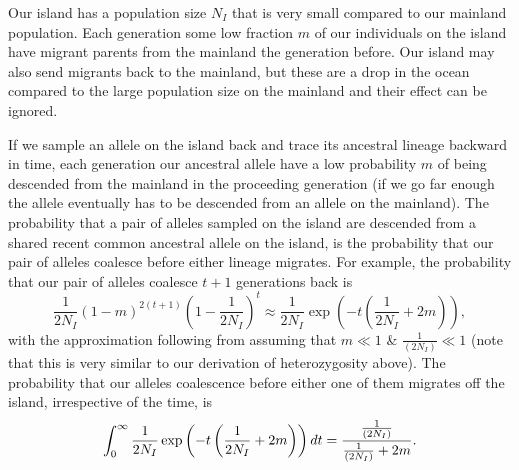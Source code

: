 Our island has a population size
$N_{I}$ that is very small compared to our mainland population.
Each generation some low fraction $m$ of our individuals on the
island have migrant parents from the mainland the generation
before. Our island may also send migrants back to the mainland, but
these are a drop in the ocean compared to the large population size on
the mainland and their effect can be ignored. 


If we sample an allele on the island back and trace its ancestral
lineage backward in time, each generation our ancestral allele have a low
probability $m$ of being descended from the mainland in the proceeding
generation (if we go far enough the allele eventually has to be
descended from an allele on the mainland). The probability that a pair of alleles sampled on the
island are descended from a shared recent common ancestral allele on the island, is the
probability that our pair of alleles coalesce before either lineage
migrates. For example, the probability that our pair of alleles
coalesce $t+1$ generations back is 
\begin{equation}
\frac{1}{2N_I}(1-m)^{2(t+1)} \left(1-\frac{1}{2N_I} \right)^{t} \approx
\frac{1}{2N_I} \exp\left( -t\left (\frac{1}{2N_I} + 2m\right) \right),
\end{equation}
with the approximation following from assuming that $m \ll 1$ \& $\frac{1}{(2N_I)}
\ll 1$ (note that this is very similar to our derivation of
heterozygosity above). The probability that our alleles coalescence before either one
of them migrates off the island, irrespective of the time, is
\begin{equation}
\int_0^{\infty} \frac{1}{2N_I} \exp\left( -t\left (\frac{1}{2N_I} +
2m\right) \right) dt = \frac{\nicefrac{1}{(2N_I)}}{\nicefrac{1}{(2N_I)} +
    2m}.
\end{equation}

